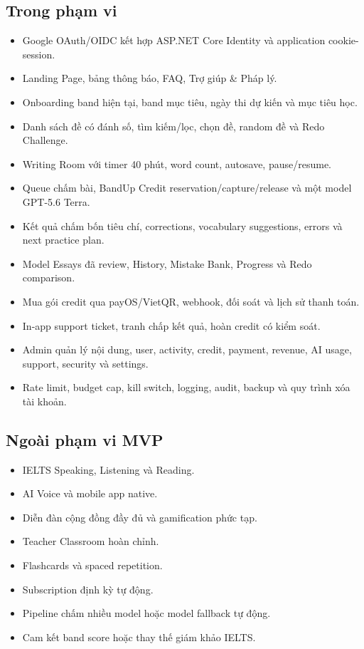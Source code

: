 \documentclass[11pt,a4paper]{article}
\begin{document}
\subsection{Trong phạm vi}
\begin{itemize}
  \item Google OAuth/\allowbreak{}OIDC kết hợp ASP.NET Core Identity và application cookie-session.
  \item Landing Page, bảng thông báo, FAQ, Trợ giúp \& Pháp lý.
  \item Onboarding band hiện tại, band mục tiêu, ngày thi dự kiến và mục tiêu học.
  \item Danh sách đề có đánh số, tìm kiếm/\allowbreak{}lọc, chọn đề, random đề và Redo Challenge.
  \item Writing Room với timer 40 phút, word count, autosave, pause/\allowbreak{}resume.
  \item Queue chấm bài, BandUp Credit reservation/\allowbreak{}capture/\allowbreak{}release và một model GPT-5.6 Terra.
  \item Kết quả chấm bốn tiêu chí, corrections, vocabulary suggestions, errors và next practice plan.
  \item Model Essays đã review, History, Mistake Bank, Progress và Redo comparison.
  \item Mua gói credit qua payOS/\allowbreak{}VietQR, webhook, đối soát và lịch sử thanh toán.
  \item In-app support ticket, tranh chấp kết quả, hoàn credit có kiểm soát.
  \item Admin quản lý nội dung, user, activity, credit, payment, revenue, AI usage, support, security và settings.
  \item Rate limit, budget cap, kill switch, logging, audit, backup và quy trình xóa tài khoản.
\end{itemize}
\subsection{Ngoài phạm vi MVP}
\begin{itemize}
  \item IELTS Speaking, Listening và Reading.
  \item AI Voice và mobile app native.
  \item Diễn đàn cộng đồng đầy đủ và gamification phức tạp.
  \item Teacher Classroom hoàn chỉnh.
  \item Flashcards và spaced repetition.
  \item Subscription định kỳ tự động.
  \item Pipeline chấm nhiều model hoặc model fallback tự động.
  \item Cam kết band score hoặc thay thế giám khảo IELTS.
\end{itemize}
\end{document}
